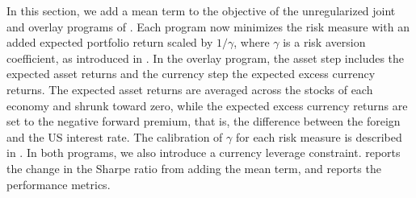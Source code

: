 In this section, we add a mean term to the objective of the unregularized joint and overlay programs of
. Each program now
minimizes the risk measure with an added expected portfolio return scaled by $1/\gamma$, where $\gamma$ is a risk aversion
coefficient, as introduced in . In the overlay program, the asset step includes the
expected asset returns and the currency step the expected excess currency returns. The expected asset returns are averaged
across the stocks of each economy and shrunk toward zero, while the expected excess currency returns are set to the
negative forward premium, that is, the difference between the foreign and the US interest rate. The calibration of $\gamma$ for each risk measure is described in
. In both programs, we also introduce a currency leverage constraint.  reports the
change in the Sharpe ratio from adding the mean term, and  reports the performance
metrics.


